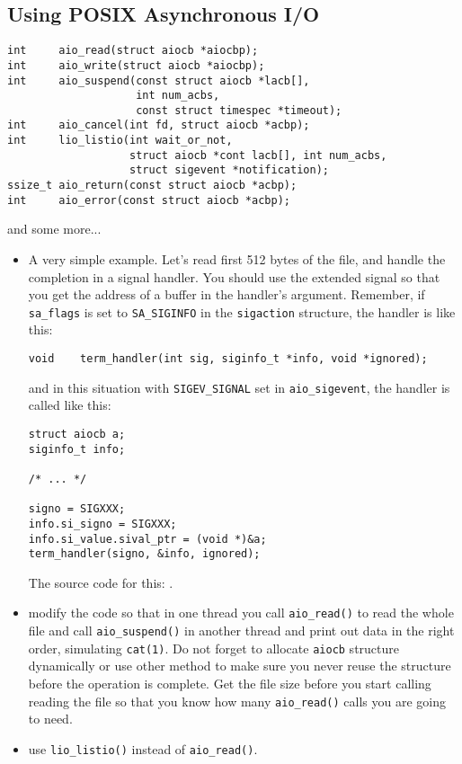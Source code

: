 \subsection{Using POSIX Asynchronous I/O}

\begin{verbatim}
int     aio_read(struct aiocb *aiocbp);
int     aio_write(struct aiocb *aiocbp);
int     aio_suspend(const struct aiocb *lacb[],
                    int num_acbs,
                    const struct timespec *timeout);
int     aio_cancel(int fd, struct aiocb *acbp);
int     lio_listio(int wait_or_not,
                   struct aiocb *cont lacb[], int num_acbs,
                   struct sigevent *notification);
ssize_t aio_return(const struct aiocb *acbp);
int     aio_error(const struct aiocb *acbp);
\end{verbatim}

and some more...


\begin{itemize}
\item  A very simple example. Let's read first 512 bytes of the file, and handle
the completion in a signal handler. You should use the extended signal so that
you get the address of a buffer in the handler's argument. Remember, if
\texttt{sa\_flags} is set to \texttt{SA\_SIGINFO} in the \texttt{sigaction}
structure, the handler is like this:

\begin{verbatim}
void	term_handler(int sig, siginfo_t *info, void *ignored);
\end{verbatim}

and in this situation with \texttt{SIGEV\_SIGNAL} set in \texttt{aio\_sigevent},
the handler is called like this:

\begin{lstlisting}
struct aiocb a;
siginfo_t info;

/* ... */

signo = SIGXXX;
info.si_signo = SIGXXX;
info.si_value.sival_ptr = (void *)&a;
term_handler(signo, &info, ignored);
\end{lstlisting}

The source code for this: .

\item {} modify the code so that in one thread you call
\texttt{aio\_read()} to read the whole file and call \texttt{aio\_suspend()} in
another thread and print out data in the right order, simulating
\texttt{cat(1)}. Do not forget to allocate \texttt{aiocb} structure dynamically
or use other method to make sure you never reuse the structure before the
operation is complete. Get the file size before you start calling reading the
file so that you know how many \texttt{aio\_read()} calls you are going to need.
\item {} use \texttt{lio\_listio()} instead of
\texttt{aio\_read()}.
\end{itemize}

